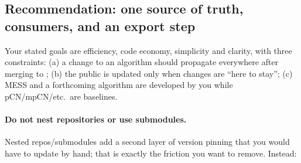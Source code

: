 \documentclass[11pt,a4paper]{article}
\theoremstyle{remark}
\begin{document}
\subsection{Recommendation: one source of truth, consumers, and an export step}
Your stated goals are efficiency, code economy, simplicity and clarity, with three constraints: (a) a change to an algorithm should propagate everywhere after merging to ; (b) the public  is updated only when changes are ``here to stay''; (c) MESS and a forthcoming algorithm are developed by you while pCN/mpCN/etc.\ are baselines.

\paragraph{Do not nest repositories or use submodules.} Nested repos/submodules add a second layer of version pinning that you would have to update by hand; that is exactly the friction you want to remove. Instead:
\end{document}
